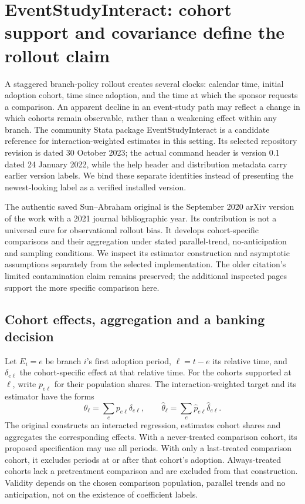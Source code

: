 \section{EventStudyInteract: cohort support and covariance define the rollout claim}
\label{sec:exec24-eventstudy-reuse}

A staggered branch-policy rollout creates several clocks: calendar time,
initial adoption cohort, time since adoption, and the time at which the sponsor
requests a comparison. An apparent decline in an event-study path may reflect
a change in which cohorts remain observable, rather than a weakening effect
within any branch. The community Stata package EventStudyInteract is a candidate
reference for interaction-weighted estimates in this setting. Its selected
repository revision is dated 30 October 2023; the actual command header is
version 0.1 dated 24 January 2022, while the help header and distribution metadata
carry earlier version labels. We bind these separate identities instead of
presenting the newest-looking label as a verified installed version.
\citep{exec24_eventstudy_sources}

The authentic saved Sun--Abraham original is the September 2020 arXiv version
of the work with a 2021 journal bibliographic year. Its contribution is not a
universal cure for observational rollout bias. It develops cohort-specific
comparisons and their aggregation under stated parallel-trend, no-anticipation
and sampling conditions. We inspect its estimator construction and asymptotic
assumptions separately from the selected implementation. The older citation's
limited contamination claim remains preserved; the additional inspected pages
support the more specific comparison here.
\citep{sun2021,exec24_eventstudy_original}

\subsection{Cohort effects, aggregation and a banking decision}
Let $E_i=e$ be branch $i$'s first adoption period, $\ell=t-e$ its relative time,
and $\delta_{e\ell}$ the cohort-specific effect at that relative time. For the
cohorts supported at $\ell$, write $p_{e\ell}$ for their population shares.
The interaction-weighted target and its estimator have the forms
\[
 \theta_\ell=\sum_e p_{e\ell}\delta_{e\ell},\qquad
 \widehat\theta_\ell=\sum_e\widehat p_{e\ell}\widehat\delta_{e\ell}.
\]
The original constructs an interacted regression, estimates cohort shares and
aggregates the corresponding effects. With a never-treated comparison cohort,
its proposed specification may use all periods. With only a last-treated
comparison cohort, it excludes periods at or after that cohort's adoption.
Always-treated cohorts lack a pretreatment comparison and are excluded from
that construction. Validity depends on the chosen comparison population,
parallel trends and no anticipation, not on the existence of coefficient labels.
\citep{exec24_eventstudy_original}

